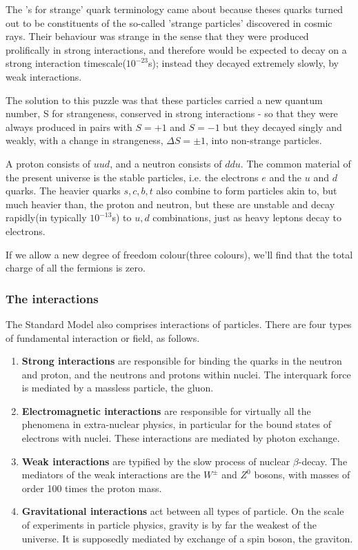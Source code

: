 \documentclass[en, device=normal]{elegantnote}
\begin{document}
The 's for strange' quark terminology came about because theses quarks turned out to be 
constituents of the so-called 'strange particles' discovered in cosmic rays. Their behaviour 
was strange in the sense that they were produced prolifically in strong interactions, 
and therefore would be expected to decay on a strong interaction timescale($10^{-23}$s); 
instead they decayed extremely slowly, by weak interactions.

The solution to this puzzle was that these particles carried a new quantum number, S for 
strangeness, conserved in strong interactions - so that they were always produced in pairs 
with $S=+1$ and $S=-1$ but they decayed singly and weakly, with a change in strangeness, 
$\Delta S=\pm 1$, into non-strange particles.

A proton consists of $uud$, and a neutron consists of $ddu$. The common material of the present 
universe is the stable particles, i.e. the electrons $e$ and the $u$ and $d$ quarks. The heavier 
quarks $s,c,b,t$ also combine to form particles akin to, but much heavier than, the proton 
and neutron, but these are unstable and decay rapidly(in typically $10^{-13}$s) to $u,d$ 
combinations, just as heavy leptons decay to electrons.

If we allow a new degree of freedom colour(three colours), we'll find that the total charge of all the 
fermions is zero.

\subsubsection{The interactions}

The Standard Model also comprises interactions of particles. There are four types of fundamental interaction or field, as follows.

\begin{enumerate}
  \item \textbf{Strong interactions} are responsible for binding the quarks in the neutron and proton, and the neutrons and protons within nuclei. The interquark force is mediated by a massless particle, the gluon.
  \item \textbf{Electromagnetic interactions} are responsible for virtually all the phenomena in extra-nuclear physics, in particular for the bound states of electrons with nuclei. These interactions are mediated by photon exchange.
  \item \textbf{Weak interactions} are typified by the slow process of nuclear $\beta$-decay. The mediators of the weak interactions are the $W^\pm$ and $Z^0$ bosons, with masses of order 100 times the proton mass.
  \item \textbf{Gravitational interactions} act between all types of particle. On the scale of experiments in particle physics, gravity is by far the weakest of the universe. It is supposedly mediated by exchange of a spin boson, the graviton.
\end{enumerate}
\end{document}
